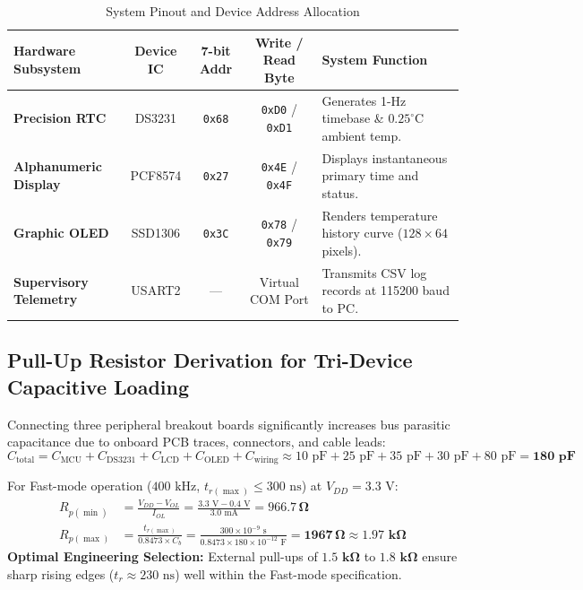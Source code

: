 \documentclass[11pt,a4paper]{article}
\begin{document}
\begin{table}[h!]
\centering
\small
\caption{System Pinout and Device Address Allocation}
\vspace{4pt}
\begin{tabularx}{\textwidth}{l c c c X}
\toprule
\textbf{Hardware Subsystem} & \textbf{Device IC} & \textbf{7-bit Addr} & \textbf{Write / Read Byte} & \textbf{System Function} \\
\midrule
\textbf{Precision RTC} & DS3231 & \texttt{0x68} & \texttt{0xD0} / \texttt{0xD1} & Generates 1-Hz timebase \& $0.25^\circ\text{C}$ ambient temp. \\
\textbf{Alphanumeric Display} & PCF8574 & \texttt{0x27} & \texttt{0x4E} / \texttt{0x4F} & Displays instantaneous primary time and status. \\
\textbf{Graphic OLED} & SSD1306 & \texttt{0x3C} & \texttt{0x78} / \texttt{0x79} & Renders temperature history curve ($128\times 64$ pixels). \\
\textbf{Supervisory Telemetry} & USART2 & --- & Virtual COM Port & Transmits CSV log records at 115200 baud to PC. \\
\bottomrule
\end{tabularx}
\end{table}

\subsection{Pull-Up Resistor Derivation for Tri-Device Capacitive Loading}
Connecting three peripheral breakout boards significantly increases bus parasitic capacitance due to onboard PCB traces, connectors, and cable leads:
\begin{equation}
C_{\text{total}} = C_{\text{MCU}} + C_{\text{DS3231}} + C_{\text{LCD}} + C_{\text{OLED}} + C_{\text{wiring}} \approx 10\text{ pF} + 25\text{ pF} + 35\text{ pF} + 30\text{ pF} + 80\text{ pF} = \mathbf{180\text{ pF}}
\end{equation}

For Fast-mode operation ($400\text{ kHz}$, $t_{r(\max)} \le 300\text{ ns}$) at $V_{DD} = 3.3\text{ V}$:
\begin{align}
R_{p(\min)} &= \frac{V_{DD} - V_{OL}}{I_{OL}} = \frac{3.3\text{ V} - 0.4\text{ V}}{3.0\text{ mA}} = \mathbf{966.7\,\Omega} \\
R_{p(\max)} &= \frac{t_{r(\max)}}{0.8473 \times C_b} = \frac{300\times 10^{-9}\text{ s}}{0.8473 \times 180\times 10^{-12}\text{ F}} = \mathbf{1967\,\Omega} \approx \mathbf{1.97\text{ k}\Omega}
\end{align}
\textbf{Optimal Engineering Selection:} External pull-ups of $\mathbf{1.5\text{ k}\Omega}$ to $\mathbf{1.8\text{ k}\Omega}$ ensure sharp rising edges ($t_r \approx 230\text{ ns}$) well within the Fast-mode specification.
\end{document}
